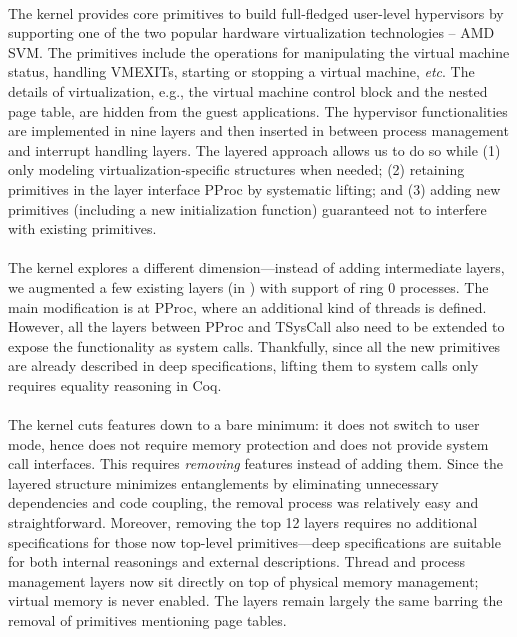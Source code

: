 {%
\paragraph{\mCTOShyper{}}
The \mCTOShyper{} kernel provides core primitives to build
full-fledged user-level hypervisors by supporting one of the two
popular hardware virtualization technologies -- AMD SVM.  The primitives
include the operations for manipulating the virtual machine status,
handling VMEXITs, starting or stopping a virtual machine, {\it etc}.
The details of virtualization, e.g., the virtual machine control block
and the nested page table, are hidden from the guest applications.
The hypervisor functionalities are implemented in nine layers and then
inserted in between process management and interrupt handling layers.
The layered approach allows us to do so while (1) only modeling
virtualization-specific structures when needed; (2) retaining
primitives in the layer interface \textsf{PProc} by systematic lifting; and
(3) adding new primitives (including a new initialization function)
guaranteed not to interfere with existing primitives.

\paragraph{\mCTOSringz{}}
The \mCTOSringz{} kernel explores a different dimension---instead
of adding intermediate layers, we augmented a few existing layers 
(in \mCTOShyper{}) with support of ring 0 processes.
The main modification is at
\textsf{PProc}, where an additional kind of threads is defined.
However, all the layers between \textsf{PProc} and \textsf{TSysCall} also
need to be extended to expose the functionality as system calls.
Thankfully, since all the new primitives are already described in deep
specifications, lifting them to system calls only requires equality
reasoning in Coq.

\paragraph{\mCTOSembed{}}
The \mCTOSembed{} kernel cuts features down to a bare minimum: it does
not switch to user mode, hence does not require memory protection and
does not provide system call interfaces.  This requires \emph{removing}
features instead of adding them.  Since the layered structure minimizes
entanglements by eliminating unnecessary dependencies and code coupling,
the removal process was relatively easy and straightforward.
Moreover, removing the top 12 layers requires no additional
specifications for those now top-level primitives---deep specifications
are suitable for both internal reasonings and external descriptions.  Thread and process
management layers now sit directly on top of physical memory
management; virtual memory is never enabled.  The
layers remain largely the same barring the removal of primitives
mentioning page tables.}


